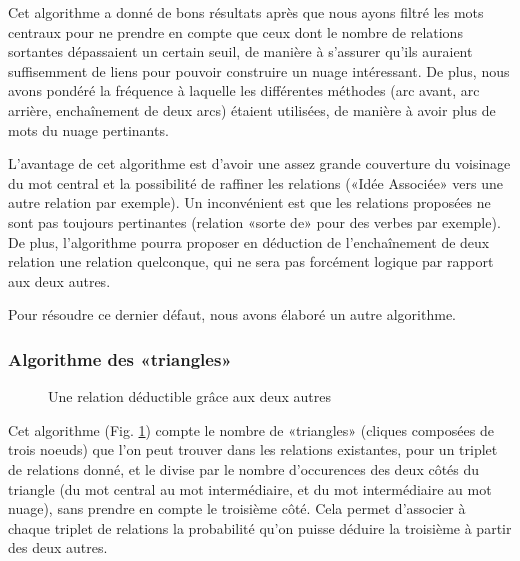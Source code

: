 \documentclass[a4paper,11pt,french]{article}
\begin{document}
Cet algorithme a donné de bons résultats après que nous ayons filtré les mots centraux pour ne prendre en compte que ceux dont le nombre de
relations sortantes dépassaient un certain seuil, de manière à s'assurer qu'ils auraient suffisemment de liens pour pouvoir construire un
nuage intéressant. De plus, nous avons pondéré la fréquence à laquelle les différentes méthodes (arc avant, arc arrière, enchaînement de
deux arcs) étaient utilisées, de manière à avoir plus de mots du nuage pertinants.

L'avantage de cet algorithme est d'avoir une assez grande couverture du voisinage du mot central et la possibilité de raffiner les
relations («Idée Associée» vers une autre relation par exemple). Un inconvénient est que les relations proposées ne sont pas toujours
pertinantes (relation «sorte de» pour des verbes par exemple). De plus, l'algorithme pourra proposer en déduction de l'enchaînement de deux
relation une relation quelconque, qui ne sera pas forcément logique par rapport aux deux autres.

Pour résoudre ce dernier défaut, nous avons élaboré un autre algorithme.

\subsubsection{Algorithme des «triangles»}
\label{sec:algo-triangles}
\begin{figure}[ht]
  \centering
  \begin{center}
  \end{center}
  \caption{Une relation déductible grâce aux deux autres}
  \label{fig:algo-triangles}
\end{figure}

Cet algorithme (Fig. \ref{fig:algo-triangles}) compte le nombre de «triangles» (cliques composées de trois noeuds) que l'on peut trouver
dans les relations existantes, pour un triplet de relations donné, et le divise par le nombre d'occurences des deux côtés du triangle (du
mot central au mot intermédiaire, et du mot intermédiaire au mot nuage), sans prendre en compte le troisième côté. Cela permet d'associer à
chaque triplet de relations la probabilité qu'on puisse déduire la troisième à partir des deux autres.
\end{document}
